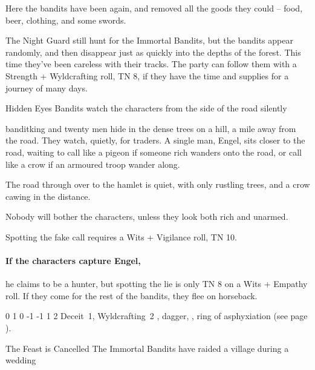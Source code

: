 \begin{multicols}{2}
\begin{boxtext}
\end{boxtext}

Here the bandits have been again, and removed all the goods they could -- food, beer, clothing, and some swords.

The Night Guard still hunt for the Immortal Bandits, but the bandits appear randomly, and then disappear just as quickly into the depths of the forest.
This time they've been careless with their tracks.
The party can follow them with a Strength + Wyldcrafting roll, TN 8, if they have the time and supplies for a journey of many days.

{Hidden Eyes}%
{Bandits watch the characters from the side of the road silently}%

\Gls{banditking} and twenty men hide in the dense trees on a hill, a mile away from the road.
They watch, quietly, for traders.
A single man, Engel, sits closer to the road, waiting to call like a pigeon if someone rich wanders onto the road, or call like a crow if an armoured troop wander along.

\begin{boxtext}

  The road through over to the hamlet is quiet, with only rustling trees, and a crow cawing in the distance.

\end{boxtext}

Nobody will bother the characters, unless they look both rich and unarmed.

Spotting the fake call requires a Wits + Vigilance roll, TN 10.

\paragraph{If the characters capture Engel,}
he claims to be a hunter, but spotting the lie is only TN 8 on a Wits + Empathy roll.
If they come for the rest of the bandits, they flee on horseback.


{0}%
{1}%
{{0}%
{-1}%
{-1}}%
{1}%
{2}%
{Deceit~1, Wyldcrafting~2}%
{\shortsword, dagger, \partialleather, ring of asphyxiation (see page \pageref{ring_asphyxiation}).}%
{}

{The Feast is Cancelled}%
{The Immortal Bandits have raided a village during a wedding}%


\end{multicols}
